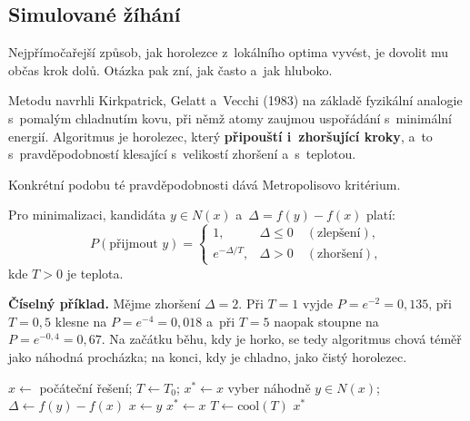 \documentclass[11pt,a4paper]{article}
\theoremstyle{definition}
\begin{document}
\subsection{Simulované žíhání}

Nejpřímočařejší způsob, jak horolezce z~lokálního optima vyvést, je dovolit mu občas
krok dolů. Otázka pak zní, jak často a~jak hluboko.

\begin{defbox}
Metodu navrhli Kirkpatrick, Gelatt a~Vecchi (1983) na základě fyzikální analogie
s~pomalým chladnutím kovu, při němž atomy zaujmou uspořádání s~minimální energií.
Algoritmus je horolezec, který \textbf{připouští i~zhoršující kroky}, a~to
s~pravděpodobností klesající s~velikostí zhoršení a~s~teplotou.
\end{defbox}

Konkrétní podobu té pravděpodobnosti dává Metropolisovo kritérium.

\begin{defbox}
Pro minimalizaci, kandidáta $y \in N(x)$ a~$\Delta = f(y) - f(x)$ platí:
\[
P(\text{přijmout } y) =
\begin{cases}
1, & \Delta \le 0 \quad (\text{zlepšení}),\\[2pt]
e^{-\Delta / T}, & \Delta > 0 \quad (\text{zhoršení}),
\end{cases}
\]
kde $T > 0$ je teplota.
\end{defbox}

\textbf{Číselný příklad.} Mějme zhoršení $\Delta = 2$. Při $T = 1$ vyjde
$P = e^{-2} = 0{,}135$, při $T = 0{,}5$ klesne na $P = e^{-4} = 0{,}018$ a~při $T = 5$
naopak stoupne na $P = e^{-0{,}4} = 0{,}67$. Na začátku běhu, kdy je horko, se tedy
algoritmus chová téměř jako náhodná procházka; na konci, kdy je chladno, jako čistý
horolezec.

\begin{algorithm}[!ht]
\caption{Simulované žíhání}
\begin{algorithmic}[1]
\State $x \gets$ počáteční řešení; $T \gets T_0$; $x^* \gets x$
    \State vyber náhodně $y \in N(x)$; $\Delta \gets f(y) - f(x)$
     $x \gets y$ \EndIf
     $x^* \gets x$ \EndIf
  \EndFor
  \State $T \gets \mathrm{cool}(T)$
\EndWhile
\Ensure $x^*$
\end{algorithmic}
\end{algorithm}
\end{document}
